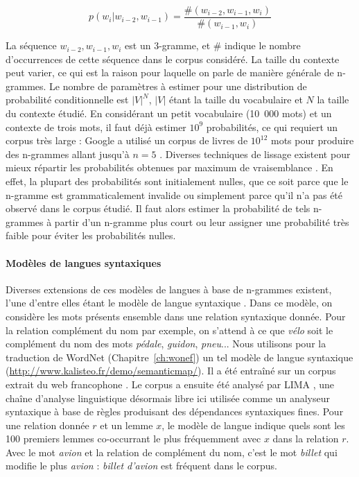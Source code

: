 \[
p(w_i|w_{i-2}, w_{i-1}) = \frac{\#(w_{i-2}, w_{i-1}, w_i)}{\#(w_{i-1}, w_i)}
\]

La séquence $w_{i-2}, w_{i-1}, w_{i}$ est un 3-gramme, et $\#$ indique le
nombre d'occurrences de cette séquence dans le corpus considéré. La taille du
contexte peut varier, ce qui est la raison pour laquelle on parle de manière
générale de n-grammes. Le nombre de paramètres à estimer pour une distribution
de probabilité conditionnelle est $|V|^N$, $|V|$ étant la taille du vocabulaire
et $N$ la taille du contexte étudié. En considérant un petit vocabulaire
(10~000 mots) et un contexte de trois mots, il faut déjà estimer $10^{9}$
probabilités, ce qui requiert un corpus très large : Google a utilisé un corpus
de livres de $10^{12}$ mots pour produire des n-grammes allant jusqu'à $n=5$
\citep{brants2006web}. Diverses techniques de lissage existent pour mieux
répartir les probabilités obtenues par maximum de vraisemblance
\citep[Chapitre~4]{jurafsky2008speech}. En effet, la plupart des probabilités
sont initialement nulles, que ce soit parce que le n-gramme est
grammaticalement invalide ou simplement parce qu'il n'a pas été observé dans le
corpus étudié. Il faut alors estimer la probabilité de tels n-grammes à partir
d'un n-gramme plus court ou leur assigner une probabilité très faible pour
éviter les probabilités nulles.

\paragraph{Modèles de langues syntaxiques} Diverses extensions de ces modèles
de langues à base de n-grammes existent, l'une d'entre elles étant le modèle de
langue syntaxique \citep{lin1998automatic,goldberg2013dataset}. Dans ce modèle,
on considère les mots présents ensemble dans une relation syntaxique donnée.
Pour la relation complément du nom par exemple, on s'attend à ce que
\textit{vélo} soit le complément du nom des mots \textit{pédale}, \textit{guidon},
\textit{pneu}... Nous utilisons pour la traduction de WordNet
(Chapitre~\ref{ch:wonef}) un tel modèle de langue syntaxique
(\url{http://www.kalisteo.fr/demo/semanticmap/}).  Il a été entraîné sur un
corpus extrait du web francophone \citep{grefenstette2007conquering}. Le corpus
a ensuite été analysé par LIMA \citep{besancon2010lima}, une chaîne d'analyse
linguistique désormais libre ici utilisée comme un analyseur syntaxique à base
de règles produisant des dépendances syntaxiques fines. Pour une relation
donnée $r$ et un lemme $x$, le modèle de langue indique quels sont les 100
premiers lemmes co-occurrant le plus fréquemment avec $x$ dans la relation $r$.
Avec le mot \textit{avion} et la relation de complément du nom, c'est le mot
\textit{billet} qui modifie le plus \textit{avion} : \textit{billet d'avion}
est fréquent dans le corpus.


